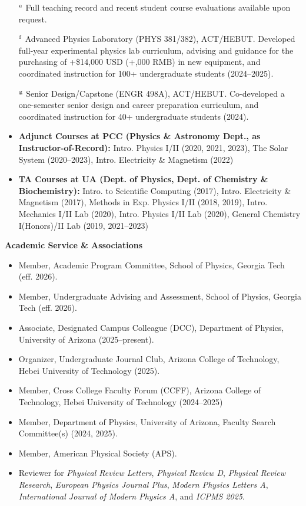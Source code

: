 \documentclass[11pt]{article}
\begin{document}
\begin{itemize}[leftmargin=*,nosep]
    \item[\(^{\rm e}\)] Full teaching record and recent student course evaluations available upon request.
    \item[\(^{\rm f}\)] Advanced Physics Laboratory (PHYS 381/382), ACT/HEBUT. Developed full-year experimental physics lab curriculum, advising and guidance for the purchasing of +\$14,000 USD (+,000 RMB) in new equipment, and coordinated instruction for 100+ undergraduate students (2024--2025).
    \item[\(^{\rm g}\)] Senior Design/Capstone (ENGR 498A), ACT/HEBUT. Co-developed a one-semester senior design and career preparation curriculum, and coordinated instruction for 40+ undergraduate students (2024).
\end{itemize}

\begin{itemize}[leftmargin=*,nosep]
    \item \textbf{Adjunct Courses at PCC (Physics \& Astronomy Dept., as Instructor-of-Record):} Intro. Physics I/II (2020, 2021, 2023), The Solar System (2020--2023), Intro. Electricity \& Magnetism (2022)
    \item \textbf{TA Courses at UA (Dept. of Physics, Dept. of Chemistry \& Biochemistry):} Intro. to Scientific Computing (2017), Intro. Electricity \& Magnetism (2017), Methods in Exp. Physics I/II (2018, 2019), Intro. Mechanics I/II Lab (2020), Intro. Physics I/II Lab (2020), General Chemistry I(Honors)/II Lab (2019, 2021--2023)
\end{itemize}

\medskip

{\Large\textbf{Academic Service \& Associations}}

\begin{itemize}[leftmargin=*,nosep]
    \item Member, Academic Program Committee, School of Physics, Georgia Tech (eff. 2026).
    \item Member, Undergraduate Advising and Assessment, School of Physics, Georgia Tech (eff. 2026).
    \item Associate, Designated Campus Colleague (DCC), Department of Physics, University of Arizona (2025--present).
    \item Organizer, Undergraduate Journal Club, Arizona College of Technology, Hebei University of Technology (2025).
    \item Member, Cross College Faculty Forum (CCFF), Arizona College of Technology, Hebei University of Technology (2024--2025)
    \item Member, Department of Physics, University of Arizona, Faculty Search Committee(s) (2024, 2025).
    \item Member, American Physical Society (APS).
    \item Reviewer for \textit{Physical Review Letters}, \textit{Physical Review D}, \textit{Physical Review Research}, \textit{European Physics Journal Plus}, \textit{Modern Physics Letters A}, \textit{International Journal of Modern Physics A}, and \textit{ICPMS 2025}.
\end{itemize}
\end{document}
